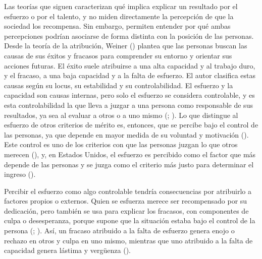 \documentclass[
  spanish,
  a4paper,
  oneside]{scrbook}
\begin{document}
Las teorías que siguen caracterizan qué implica explicar un resultado
por el esfuerzo o por el talento, y no miden directamente la percepción
de que la sociedad los recompensa. Sin embargo, permiten entender por
qué ambas percepciones podrían asociarse de forma distinta con la
posición de las personas. Desde la teoría de la atribución, Weiner
() plantea que las
personas buscan las causas de sus éxitos y fracasos para comprender su
entorno y orientar sus acciones futuras. El éxito suele atribuirse a una
alta capacidad y al trabajo duro, y el fracaso, a una baja capacidad y a
la falta de esfuerzo. El autor clasifica estas causas según su locus, su
estabilidad y su controlabilidad. El esfuerzo y la capacidad son causas
internas, pero solo el esfuerzo se considera controlable, y es esta
controlabilidad la que lleva a juzgar a una persona como responsable de
sus resultados, ya sea al evaluar a otros o a uno mismo
(;
). Lo que
distingue al esfuerzo de otros criterios de mérito es, entonces, que se
percibe bajo el control de las personas, ya que depende en mayor medida
de su voluntad y motivación
().
Este control es uno de los criterios con que las personas juzgan lo que
otros merecen (), y, en Estados Unidos, el esfuerzo es percibido como el
factor que más depende de las personas y se juzga como el criterio más
justo para determinar el ingreso
().

Percibir el esfuerzo como algo controlable tendría consecuencias por
atribuirlo a factores propios o externos. Quien se esfuerza merece ser
recompensado por su dedicación, pero también se usa para explicar los
fracasos, con componentes de culpa o desesperanza, porque supone que la
situación estaba bajo el control de la persona
(;
). Así, un fracaso atribuido a la falta de esfuerzo genera
enojo o rechazo en otros y culpa en uno mismo, mientras que uno
atribuido a la falta de capacidad genera lástima y vergüenza
().
\end{document}
